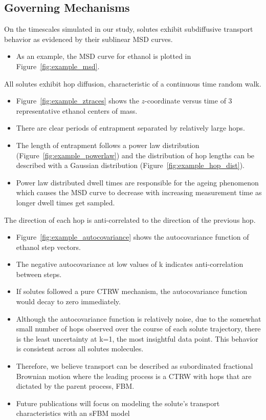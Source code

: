 \documentclass{article}
\begin{document}
  \subsection*{Governing Mechanisms}\label{section:mechanism_overview}  
  
  On the timescales simulated in our study, solutes exhibit subdiffusive
  transport behavior as evidenced by their sublinear MSD curves. 
  \begin{itemize}  
	\item As an example, the MSD curve for ethanol is plotted in 
	Figure~\ref{fig:example_msd}.
  \end{itemize}
  
  \noindent All solutes exhibit hop diffusion, characteristic of a continuous time random walk.
  \begin{itemize}
  	\item Figure~\ref{fig:example_ztraces} shows the $z$-coordinate versus time of
  	3 representative ethanol centers of mass.
  	\item There are clear periods of entrapment separated by relatively large hops.
  	\item The length of entrapment follows a power law distribution 
  	(Figure~\ref{fig:example_powerlaw}) and the distribution of hop lengths can be 
  	described with a Gaussian distribution (Figure~\ref{fig:example_hop_dist}).
  	\item Power law distributed dwell times are responsible for the ageing phenomenon
  	which causes the MSD curve to decrease with increasing measurement time as longer
  	dwell times get sampled.
  \end{itemize}
  
  \noindent The direction of each hop is anti-correlated to the direction of the previous hop.
  \begin{itemize}
  	\item Figure~\ref{fig:example_autocovariance} shows the autocovariance function of 
  	ethanol step vectors. %
  	\item The negative autocovariance at low values of k indicates anti-correlation
  	between steps. 
  	\item If solutes followed a pure CTRW mechanism, the autocovariance function would
  	decay to zero immediately.
  	\item Although the autocovariance function is relatively noise, due to the somewhat small
  	number of hops observed over the course of each solute trajectory, there is the least 
  	uncertainty at k=1, the most insightful data point. This behavior is consistent across
  	all solutes molecules. %
  	\item Therefore, we believe transport can be described as subordinated fractional Brownian
  	motion where the leading process is a CTRW with hops that are dictated by the parent
  	process, FBM.
  	\item Future publications will focus on modeling the solute's transport characteristics
  	with an sFBM model
  \end{itemize}
\end{document}
